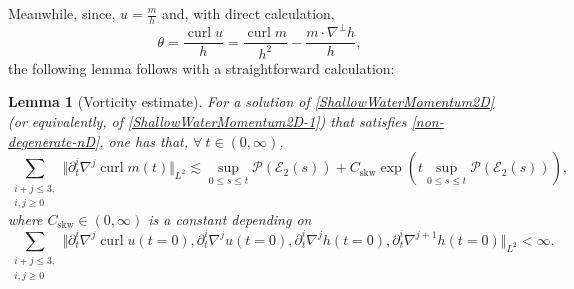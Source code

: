 \documentclass[reqno,11pt]{amsart}
\newcommand{\norm}[2]{\Vert #1 \Vert_{#2}}
\DeclareMathOperator{\curl}{curl}
\theoremstyle{plain}
\newtheorem{lemma}[theorem]{Lemma}
\theoremstyle{definition}
\numberwithin{equation}{section}
\begin{document}
Meanwhile, since, $ u = \frac{m}{h} $ and, with direct calculation, 
\begin{equation}
\label{eq:theta-2}
\theta=\frac{\curl u}{h}= \frac{\curl m}{h^2}-\frac{m\cdot \nabla^{\perp}h}{h},
\end{equation}
the following lemma follows with a straightforward calculation:
\begin{lemma}[Vorticity estimate]
\label{lm:vorticity}
For a solution of \eqref{ShallowWaterMomentum2D} (or equivalently, of \eqref{ShallowWaterMomentum2D-1}) that satisfies \eqref{non-degenerate-nD}, one has that, $ \forall \ t\in (0,\infty) $,  
\begin{equation}
    \label{est:vorticity}
    \sum_{\substack{i+j\leq 3, \\ i,j \geq 0}} 
    \norm{\partial_t^i \nabla^j \curl m (t)}{L^2} 
    \lesssim \sup_{0\leq s \leq t} \mathcal P(\mathcal E_2(s)) + C_\mathrm{skw} 
    \exp(t \sup_{0\leq s \leq t} \mathcal P(\mathcal E_2(s))),
\end{equation}
where $ C_\mathrm{skw}\in(0,\infty) $ is a constant depending on 
\begin{equation}
    \label{2d-initial-bound}
    \sum_{\substack{i+j\leq 3,\\i,j \geq 0}} \norm{\partial_t^i \nabla^j \curl u(t=0),\partial_t^i \nabla^j u(t=0) , \partial_t^i \nabla^j h(t=0),\partial_t^i \nabla^{j+1} h(t=0)}{L^2} < \infty. 
\end{equation}
\end{lemma}
\end{document}
